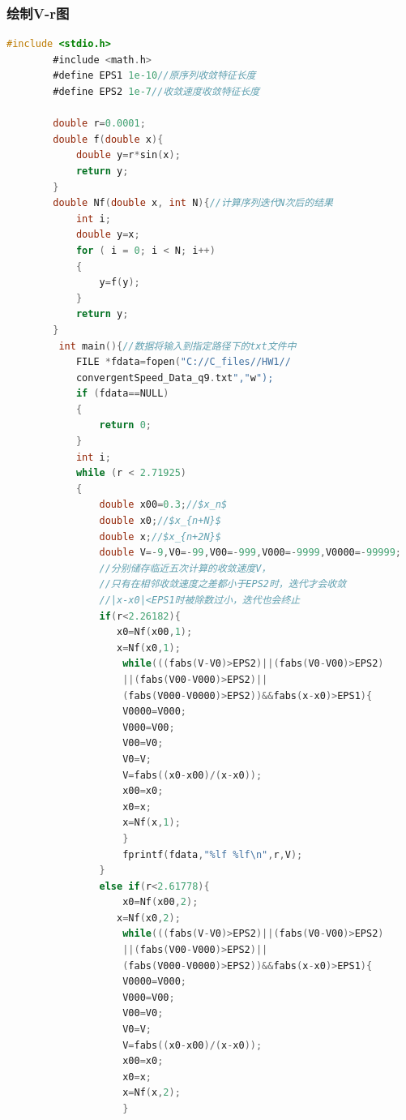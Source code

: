 \documentclass[10pt, a4paper]{article}
\begin{document}
    \subsubsection{绘制V-r图}
    \begin{lstlisting}[language=C]
        #include <stdio.h>
        #include <math.h>
        #define EPS1 1e-10//原序列收敛特征长度
        #define EPS2 1e-7//收敛速度收敛特征长度
        
        double r=0.0001;
        double f(double x){
            double y=r*sin(x);
            return y;
        }
        double Nf(double x, int N){//计算序列迭代N次后的结果
            int i;
            double y=x;
            for ( i = 0; i < N; i++)
            {
                y=f(y);
            }
            return y;
        }
         int main(){//数据将输入到指定路径下的txt文件中
            FILE *fdata=fopen("C://C_files//HW1//
            convergentSpeed_Data_q9.txt","w");
            if (fdata==NULL)
            {
                return 0;
            }
            int i;
            while (r < 2.71925)
            {
                double x00=0.3;//$x_n$
                double x0;//$x_{n+N}$
                double x;//$x_{n+2N}$
                double V=-9,V0=-99,V00=-999,V000=-9999,V0000=-99999;
                //分别储存临近五次计算的收敛速度V，
                //只有在相邻收敛速度之差都小于EPS2时，迭代才会收敛
                //|x-x0|<EPS1时被除数过小，迭代也会终止
                if(r<2.26182){
                   x0=Nf(x00,1);
                   x=Nf(x0,1);
                    while(((fabs(V-V0)>EPS2)||(fabs(V0-V00)>EPS2)
                    ||(fabs(V00-V000)>EPS2)||
                    (fabs(V000-V0000)>EPS2))&&fabs(x-x0)>EPS1){
                    V0000=V000;
                    V000=V00;
                    V00=V0;
                    V0=V;
                    V=fabs((x0-x00)/(x-x0));
                    x00=x0;
                    x0=x;
                    x=Nf(x,1);
                    }
                    fprintf(fdata,"%lf %lf\n",r,V); 
                }
                else if(r<2.61778){
                    x0=Nf(x00,2);
                   x=Nf(x0,2);
                    while(((fabs(V-V0)>EPS2)||(fabs(V0-V00)>EPS2)
                    ||(fabs(V00-V000)>EPS2)||
                    (fabs(V000-V0000)>EPS2))&&fabs(x-x0)>EPS1){
                    V0000=V000;
                    V000=V00;
                    V00=V0;
                    V0=V;
                    V=fabs((x0-x00)/(x-x0));
                    x00=x0;
                    x0=x;
                    x=Nf(x,2);
                    }

\end{lstlisting}
\end{document}
